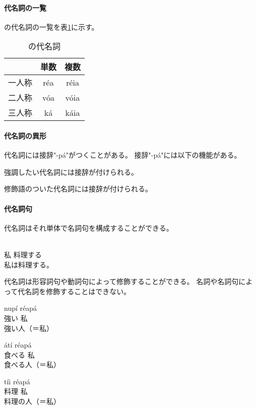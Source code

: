 \paragraph{代名詞の一覧}
\langname の代名詞の一覧を表\ref{tab:pronouns}に示す。

\begin{table}[H]
    \centering
    \begin{tabular}{lcc}
        \toprule
        & 単数 & 複数 \\
        \midrule
        一人称 & r\'ea & r\'eia \\
        二人称 & v\'oa & v\'oia \\
        三人称 & k\'a & k\'aia \\
  \bottomrule
    \end{tabular}
    \caption{\centering \langname の代名詞}
    \label{tab:pronouns}
\end{table}

\paragraph{代名詞の異形}

代名詞には接辞"-p\'a"がつくことがある。
接辞"-p\'a"には以下の機能がある。

強調したい代名詞には接辞が付けられる。

修飾語のついた代名詞には接辞が付けられる。

\paragraph{代名詞句}

代名詞はそれ単体で名詞句を構成することができる。

\begin{exe}
    \ex \gll [r\'ea] [p\'a\'a t\'ii nep\'e\'a] \\
        私 料理する \\
    \glt 私は料理する。
\end{exe}

代名詞は形容詞句や動詞句によって修飾することができる。
名詞や名詞句によって代名詞を修飾することはできない。

\begin{exe}
    \ex \gll nup\'i r\'eap\'a \\
        強い 私 \\
    \glt 強い人（＝私）
\end{exe}
\begin{exe}
    \ex \gll \'at\'i r\'eap\'a \\
        食べる 私 \\
    \glt 食べる人（＝私）
\end{exe}
\begin{exe}
    \ex \gll *t\'ii r\'eap\'a \\
        料理 私 \\
    \glt 料理の人（＝私）
\end{exe}

